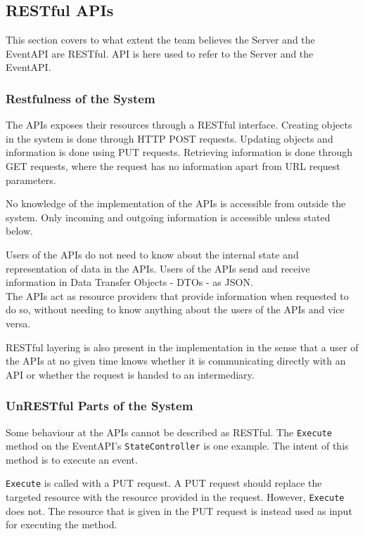 \subsection{RESTful APIs}
This section covers to what extent the team believes the Server and the EventAPI are RESTful. API is here used to refer to the Server and the EventAPI. 

\subsubsection{Restfulness of the System}
The APIs exposes their resources through a RESTful interface. Creating objects in the system is done through HTTP POST requests. Updating objects and information is done using PUT requests. Retrieving information is done through GET requests, where the request has no information apart from URL request parameters.
 
No knowledge of the implementation of the APIs is accessible from outside the system. Only incoming and outgoing information is accessible unless stated below. 

Users of the APIs do not need to know about the internal state and representation of data in the APIs. Users of the APIs send and receive information in Data Transfer Objects - DTOs - as JSON.\\

The APIs act as resource providers that provide information when requested to do so, without needing to know anything about the users of the APIs and vice versa. 

RESTful layering is also present in the implementation in the sense that a user of the APIs at no given time knows whether it is communicating directly with an API or whether the request is handed to an intermediary.

\subsubsection{UnRESTful Parts of the System}
Some behaviour at the APIs cannot be described as RESTful. The \texttt{Execute} method on the EventAPI's \texttt{StateController} is one example. The intent of this method is to execute an event. 

\texttt{Execute} is called with a PUT request. A PUT request should replace the targeted resource with the resource provided in the request. However, \texttt{Execute} does not. The resource that is given in the PUT request is instead used as input for executing the method. 

